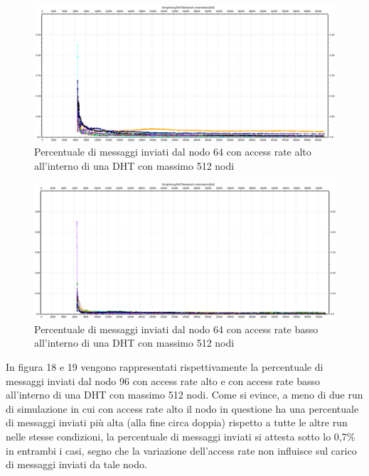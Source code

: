 \documentclass[	
	DIV=calc,
	paper=a4,
	fontsize=11pt,
	onecolumn
]{scrartcl} %
\begin{document}
	\begin{figure}[H]
		\centering
		\includegraphics[scale=0.35]	{SymphonyDHT/plots/PercentageOfMessagesSent/512_Nodes_FastAccess/SymphonyDHT_512Nodes_FastAccess_Node64.png}
		\caption{Percentuale di messaggi inviati dal nodo 64 con access rate alto all'interno di una DHT con massimo 512 nodi}
		\label{Figura 16}
	\end{figure}
	\begin{figure}[H]
		\centering
		\includegraphics[scale=0.35]	{SymphonyDHT/plots/PercentageOfMessagesSent/512_Nodes_SlowAccess/SymphonyDHT_512Nodes_SlowAccess_Node64.png}
		\caption{Percentuale di messaggi inviati dal nodo 64 con access rate basso all'interno di una DHT con massimo 512 nodi}
		\label{Figura 17}
	\end{figure}		
	
	In figura 18 e 19 vengono rappresentati rispettivamente la percentuale di messaggi inviati dal nodo 96 con access rate alto e con access rate basso all'interno di una DHT con massimo 512 nodi. Come si evince, a meno di due run di simulazione in cui con access rate alto il nodo in questione ha una percentuale di messaggi inviati più alta (alla fine circa doppia) rispetto a tutte le altre run nelle stesse condizioni, la percentuale di messaggi inviati si attesta sotto lo 0,7\% in entrambi i casi, segno che la variazione dell'access rate non influisce sul carico di messaggi inviati da tale nodo.
	
\end{document}
